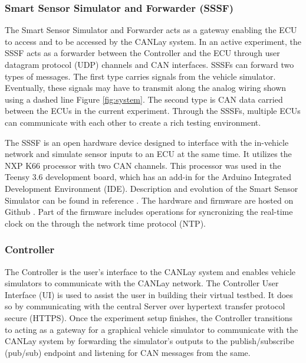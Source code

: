 \documentclass[letterpaper,twocolumn,12pt]{article}
\begin{document}
\subsubsection{Smart Sensor Simulator and Forwarder (SSSF)}
The Smart Sensor Simulator and Forwarder acts as a gateway enabling the ECU to access and to be accessed by the CANLay system. 
In an active experiment, the SSSF acts as a forwarder between the Controller and the ECU through user datagram protocol (UDP) channels and CAN interfaces. SSSFs can forward two types of messages. 
The first type carries signals from the vehicle simulator. Eventually, these signals may have to transmit along the analog wiring shown using a dashed line Figure \ref{fig:system}.  
The second type is CAN data carried between the ECUs in the current experiment. Through the SSSFs, multiple ECUs can communicate with each other to create a rich testing environment.

The SSSF is an open hardware device designed to interface with the in-vehicle network and simulate sensor inputs to an ECU at the same time. It utilizes the NXP K66 processor with two CAN channels. This processor was used in the Teensy 3.6 development board, which has an add-in for the Arduino Integrated Development Environment (IDE). Description and evolution of the Smart Sensor Simulator can be found in reference \cite{RamRohitThesis}. The hardware and firmware are hosted on Github \cite{github_sss3}. Part of the firmware includes operations for syncronizing the real-time clock on the through the network time protocol (NTP). 

\subsubsection{Controller}
The Controller is the user's interface to the CANLay system and enables vehicle simulators to communicate with the CANLay network. The Controller User Interface (UI) is used to assist the user in building their virtual testbed. 
It does so by communicating with the central Server over hypertext transfer protocol secure (HTTPS). 
Once the experiment setup finishes, the Controller transitions to acting as a gateway for a graphical vehicle simulator to communicate with the CANLay system by forwarding the simulator's outputs to the publish/subscribe (pub/sub) endpoint and listening for CAN messages from the same.
\end{document}
